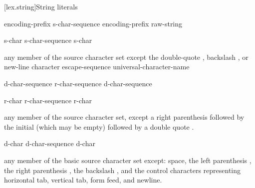 [lex.string]{String literals}

%
\begin{bnf}
\br
    encoding-prefix\opt{}  s-char-sequence\opt{} \br
    encoding-prefix\opt{}  raw-string
\end{bnf}

\begin{bnf}
\br
    s-char\br
    s-char-sequence s-char
\end{bnf}

\begin{bnftab}
\br
\>\textnormal{any member of the source character set except}\br
\>\>\textnormal{the double-quote , backslash \terminal{\textbackslash}, or new-line character}\br
\>escape-sequence\br
\>universal-character-name
\end{bnftab}

\begin{bnf}
\br
     d-char-sequence\opt{} \terminal{(} r-char-sequence\opt{} \terminal{)} d-char-sequence\opt{} 
\end{bnf}

\begin{bnf}
\br
    r-char\br
    r-char-sequence r-char
\end{bnf}

\begin{bnftab}
\br
\>\textnormal{any member of the source character set, except}\br
\>\>\textnormal{a right parenthesis \terminal{)} followed by the initial }\br
\>\>\textnormal{(which may be empty) followed by a double quote .}
\end{bnftab}

\begin{bnf}
\br
    d-char\br
    d-char-sequence d-char
\end{bnf}

\begin{bnftab}
\br
\>\textnormal{any member of the basic source character set except:}\br
\>\>\textnormal{space, the left parenthesis \terminal{(}, the right parenthesis \terminal{)}, the backslash \terminal{\textbackslash},}\br
\>\>\textnormal{and the control characters representing horizontal tab,}\br
\>\>\textnormal{vertical tab, form feed, and newline.}
\end{bnftab}

